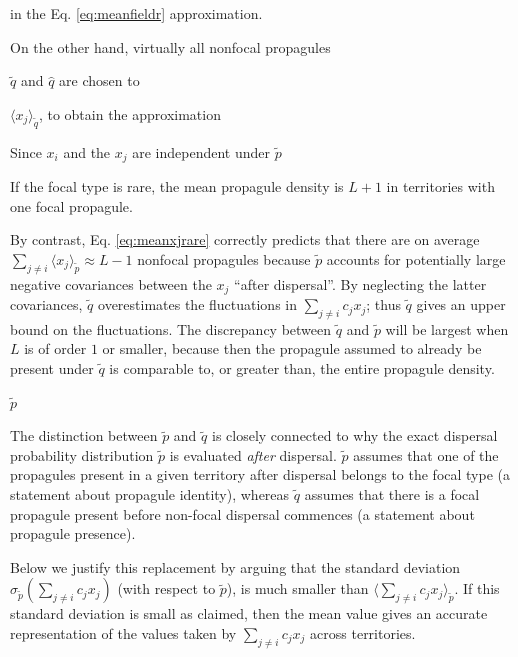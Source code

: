 \documentclass[12pt]{article}
\begin{document}
in the Eq. \eqref{eq:meanfieldr} approximation. 

On the other hand, virtually all nonfocal propagules 


$\tilde{q}$ and $\hat{q}$ are chosen to 

$\langle x_j\rangle_{\tilde{q}}$, to obtain the approximation



 
Since $x_i$ and the $x_j$ are independent under $\tilde{p}$

If the focal type is rare, the mean propagule density is $L+1$ in territories with one focal propagule. 



By contrast, Eq. \eqref{eq:meanxjrare} correctly predicts that there are on average $\sum_{j\neq i}\langle x_j \rangle_{\tilde{p}}\approx L-1$ nonfocal propagules because $\tilde{p}$ accounts for potentially large negative covariances between the $x_j$ ``after dispersal''. By neglecting the latter covariances, $\tilde{q}$ overestimates the fluctuations in $\sum_{j\neq i} c_j x_j$; thus $\tilde{q}$ gives an upper bound on the fluctuations. The discrepancy between $\tilde{q}$ and $\tilde{p}$ will be largest when $L$ is of order $1$ or smaller, because then the propagule assumed to already be present under $\tilde{q}$ is comparable to, or greater than, the entire propagule density.

$\tilde{p}$


The distinction between $\tilde{p}$ and $\tilde{q}$ is closely connected to why the exact dispersal probability distribution $\tilde{p}$ is evaluated \textit{after} dispersal. $\tilde{p}$ assumes that one of the propagules present in a given territory after dispersal belongs to the focal type (a statement about propagule identity), whereas $\tilde{q}$ assumes that there is a focal propagule present before non-focal dispersal commences (a statement about propagule presence). 



Below we justify this replacement by arguing that the standard deviation $\sigma_{\tilde{p}}(\sum_{j\neq i} c_j x_j)$ (with respect to $\tilde{p}$), is much smaller than $\langle\sum_{j\neq i} c_j x_j\rangle_{\tilde{p}}$. If this standard deviation is small as claimed, then the mean value gives an accurate representation of the values taken by $\sum_{j\neq i} c_j x_j$ across territories. 
\end{document}
